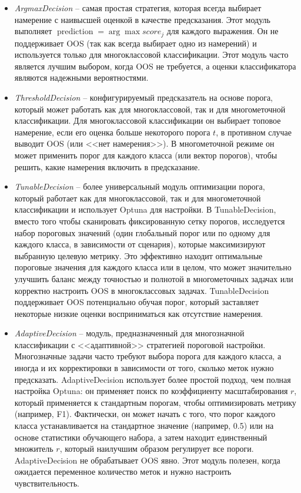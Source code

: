 \documentclass[14pt,a4paper,oneside,openany]{extbook}
\begin{document}
\begin{itemize}
\item \emph{ArgmaxDecision} -- самая простая стратегия, которая всегда выбирает намерение с наивысшей оценкой в качестве предсказания. Этот модуль выполняет \(\operatorname{prediction} = \arg\max score_j\) для каждого выражения. Он не поддерживает OOS (так как всегда выбирает одно из намерений) и используется только для многоклассовой классификации. Этот модуль часто является лучшим выбором, когда OOS не требуется, а оценки классификатора являются надежными вероятностями.

\item \emph{ThresholdDecision} -- конфигурируемый предсказатель на основе порога, который может работать как для многоклассовой, так и для многометочной классификации. Для многоклассовой классификации он выбирает топовое намерение, если его оценка больше некоторого порога \(t\), в противном случае выводит OOS (или {}<<нет намерения>>{}). В многометочной режиме он может применить порог для каждого класса (или вектор порогов), чтобы решить, какие намерения включить в предсказание.

\item \emph{TunableDecision} -- более универсальный модуль оптимизации порога, который работает как для многоклассовой, так и для многометочной классификации и использует Optuna для настройки. В TunableDecision, вместо того чтобы сканировать фиксированную сетку порогов, исследуется набор пороговых значений (один глобальный порог или по одному для каждого класса, в зависимости от сценария), которые максимизируют выбранную целевую метрику. Это эффективно находит оптимальные пороговые значения для каждого класса или в целом, что может значительно улучшить баланс между точностью и полнотой в многометочных задачах или корректно настроить OOS в многоклассовых задачах. TunableDecision поддерживает OOS потенциально обучая порог, который заставляет некоторые низкие оценки восприниматься как отсутствие намерения.

\item \emph{AdaptiveDecision} -- модуль, предназначенный для многозначной классификации с {}<<адаптивной>>{} стратегией пороговой настройки. Многозначные задачи часто требуют выбора порога для каждого класса, а иногда и их корректировки в зависимости от того, сколько меток нужно предсказать. AdaptiveDecision использует более простой подход, чем полная настройка Optuna: он применяет поиск по коэффициенту масштабирования \(r\), который применяется к стандартным порогам, чтобы оптимизировать метрику (например, F1). Фактически, он может начать с того, что порог каждого класса устанавливается на стандартное значение (например, 0.5) или на основе статистики обучающего набора, а затем находит единственный множитель \(r\), который наилучшим образом регулирует все пороги. AdaptiveDecision не обрабатывает OOS явно. Этот модуль полезен, когда ожидается переменное количество меток и нужно настроить чувствительность.
\end{itemize}
\end{document}
